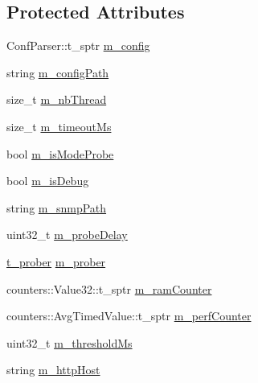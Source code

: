 \subsection*{Protected Attributes}
\begin{DoxyCompactItemize}
\item 
Conf\+Parser\+::t\+\_\+sptr \hyperlink{classxtd_1_1servers_1_1app_1_1HttpServer_ada282c895467a8d2fcaee543560958dc}{m\+\_\+config}
\item 
string \hyperlink{classxtd_1_1servers_1_1app_1_1HttpServer_aa07526617267875dd907e29b99711ab6}{m\+\_\+config\+Path}
\item 
size\+\_\+t \hyperlink{classxtd_1_1servers_1_1app_1_1HttpServer_a2f0812d24ccfd55e943f3144c672b473}{m\+\_\+nb\+Thread}
\item 
size\+\_\+t \hyperlink{classxtd_1_1servers_1_1app_1_1HttpServer_adcaefcc003e9503dbe6ebea90bf70ef7}{m\+\_\+timeout\+Ms}
\item 
bool \hyperlink{classxtd_1_1servers_1_1app_1_1HttpServer_a3ae2e35fc931b303e244b01e277cb8dd}{m\+\_\+is\+Mode\+Probe}
\item 
bool \hyperlink{classxtd_1_1servers_1_1app_1_1HttpServer_ae8b1e546b8f464e0a18c6b737ed82df8}{m\+\_\+is\+Debug}
\item 
string \hyperlink{classxtd_1_1servers_1_1app_1_1HttpServer_a555ce1e115602fda522a5c0a675dace3}{m\+\_\+snmp\+Path}
\item 
uint32\+\_\+t \hyperlink{classxtd_1_1servers_1_1app_1_1HttpServer_a87fc30b2e7e6ab2aabc2c46c884d7f17}{m\+\_\+probe\+Delay}
\item 
\hyperlink{classxtd_1_1servers_1_1app_1_1HttpServer_ace89439f838ede46ec55a6ec7cc27888}{t\+\_\+prober} \hyperlink{classxtd_1_1servers_1_1app_1_1HttpServer_aa26ddc958ab07774e8ba45e89dc0011b}{m\+\_\+prober}
\item 
counters\+::\+Value32\+::t\+\_\+sptr \hyperlink{classxtd_1_1servers_1_1app_1_1HttpServer_a0758f122d486bc068d796d4ce550e99f}{m\+\_\+ram\+Counter}
\item 
counters\+::\+Avg\+Timed\+Value\+::t\+\_\+sptr \hyperlink{classxtd_1_1servers_1_1app_1_1HttpServer_afc57d4c9bc2f9a47440e3c54eb92b1fb}{m\+\_\+perf\+Counter}
\item 
uint32\+\_\+t \hyperlink{classxtd_1_1servers_1_1app_1_1HttpServer_ad7f8a9a0475e17154850c3d575bf6f05}{m\+\_\+threshold\+Ms}
\item 
string \hyperlink{classxtd_1_1servers_1_1app_1_1HttpServer_af1676247676379d0c12008bdcd5b7e17}{m\+\_\+http\+Host}
\item 

\end{DoxyCompactItemize}
